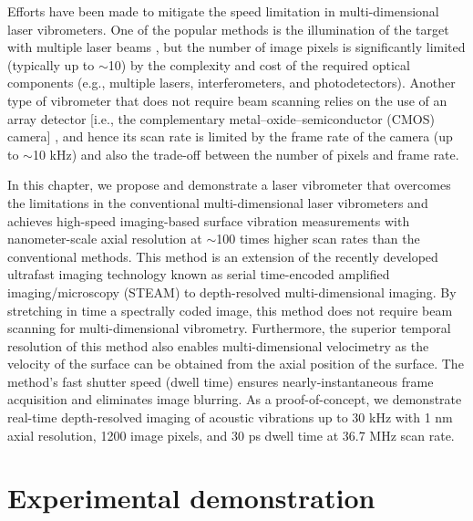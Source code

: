 Efforts have been made to mitigate the speed limitation in multi-dimensional laser vibrometers. One of the popular methods is the illumination of the target with multiple laser beams \cite{zheng1998multichannel,fu2010spatially}, but the number of image pixels is significantly limited (typically up to $\sim$10) \cite{zheng1998multichannel,fu2010spatially} by the complexity and cost of the required optical components (e.g., multiple lasers, interferometers, and photodetectors). Another type of vibrometer that does not require beam scanning relies on the use of an array detector [i.e., the complementary metal–oxide–semiconductor (CMOS) camera] \cite{popescu2006optical}, and hence its scan rate is limited by the frame rate of the camera (up to $\sim$10 kHz) \cite{popescu2006optical} and also the trade-off between the number of pixels and frame rate.

In this chapter, we propose and demonstrate a laser vibrometer that overcomes the limitations in the conventional multi-dimensional laser vibrometers and achieves high-speed imaging-based surface vibration measurements with nanometer-scale axial resolution at $\sim$100 times higher scan rates than the conventional methods. This method is an extension of the recently developed ultrafast imaging technology known as serial time-encoded amplified imaging/microscopy (STEAM) \cite{goda2009serial,goda2008amplified,qian2009real} to depth-resolved multi-dimensional imaging. By stretching in time a spectrally coded image, this method does not require beam scanning for multi-dimensional vibrometry. Furthermore, the superior temporal resolution of this method also enables multi-dimensional velocimetry as the velocity of the surface can be obtained from the axial position of the surface. The method’s fast shutter speed (dwell time) ensures nearly-instantaneous frame acquisition and eliminates image blurring. As a proof-of-concept, we demonstrate real-time depth-resolved imaging of acoustic vibrations up to 30 kHz with 1 nm axial resolution, 1200 image pixels, and 30 ps dwell time at 36.7 MHz scan rate.

\section{Experimental demonstration}

